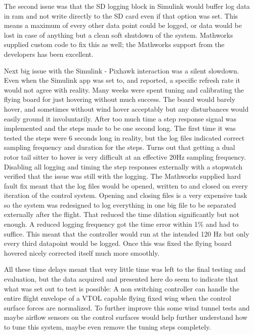 \documentclass{article}
\begin{document}
The second issue was that the SD logging block in Simulink would buffer log data in ram and not write directly to the SD card even if that option was set.
This means a maximum of every other data point could be logged, or data would be lost in case of anything but a clean soft shutdown of the system.
Mathworks supplied custom code to fix this as well; the Mathworks support from the developers has been excellent.

Next big issue with the Simulink - Pixhawk interaction was a silent slowdown.
Even when the Simulink app was set to, and reported, a specific refresh rate it would not agree with reality.
Many weeks were spent tuning and calibrating the flying board for just hovering without much success. 
The board would barely hover, and sometimes without wind hover acceptably but any disturbances would easily ground it involuntarily. 
After too much time a step response signal was implemented and the steps made to be one second long.
The first time it was tested the steps were 6 seconds long in reality, but the log files indicated correct sampling frequency and duration for the steps.
Turns out that getting a dual rotor tail sitter to hover is very difficult at an effective 20Hz sampling frequency.
Disabling all logging and timing the step responses externally with a stopwatch verified that the issue was still with the logging.
The Mathworks supplied hard fault fix meant that the log files would be opened, written to and closed on every iteration of the control system.
Opening and closing files is a very expensive task so the system was redesigned to log everything in one big file to be separated externally after the flight.
That reduced the time dilation significantly but not enough.
A reduced logging frequency got the time error within 1\% and had to suffice.
This meant that the controller would run at the intended 120 Hz but only every third datapoint would be logged.
Once this was fixed the flying board hovered nicely corrected itself much more smoothly.

All these time delays meant that very little time was left to the final testing and evaluation, but the data acquired and presented here do seem to indicate that what was set out to test is possible:
A non switching controller can handle the entire flight envelope of a VTOL capable flying fixed wing when the control surface forces are normalized.
To further improve this some wind tunnel tests and maybe airflow sensors on the control surfaces would help further understand how to tune this system, maybe even remove the tuning steps completely.
\end{document}
